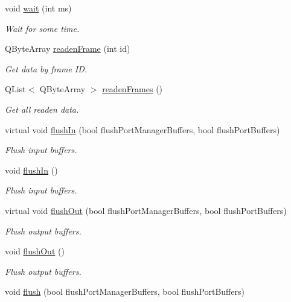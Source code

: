 \begin{DoxyCompactItemize}
void \hyperlink{classmdt_port_manager_aaa85e0200aba0e0f4392dfe01abae2cf}{wait} (int ms)
\begin{DoxyCompactList}\small\item\em Wait for some time. \end{DoxyCompactList}\item 
Q\-Byte\-Array \hyperlink{classmdt_port_manager_a830ae182d06dd6a52c43a7f45b9240ac}{readen\-Frame} (int id)
\begin{DoxyCompactList}\small\item\em Get data by frame I\-D. \end{DoxyCompactList}\item 
Q\-List$<$ Q\-Byte\-Array $>$ \hyperlink{classmdt_port_manager_addd5dcae9644cea42a9871205af41796}{readen\-Frames} ()
\begin{DoxyCompactList}\small\item\em Get all readen data. \end{DoxyCompactList}\item 
virtual void \hyperlink{classmdt_port_manager_ac0844a5cd4043a95a479d458ac7ce590}{flush\-In} (bool flush\-Port\-Manager\-Buffers, bool flush\-Port\-Buffers)
\begin{DoxyCompactList}\small\item\em Flush input buffers. \end{DoxyCompactList}\item 
void \hyperlink{classmdt_port_manager_a4c44ce6ec40c4afc6be441c10d7ee827}{flush\-In} ()
\begin{DoxyCompactList}\small\item\em Flush input buffers. \end{DoxyCompactList}\item 
virtual void \hyperlink{classmdt_port_manager_a3f0c2722a41c49de2bea9013bccd049c}{flush\-Out} (bool flush\-Port\-Manager\-Buffers, bool flush\-Port\-Buffers)
\begin{DoxyCompactList}\small\item\em Flush output buffers. \end{DoxyCompactList}\item 
void \hyperlink{classmdt_port_manager_ab34018a9653a5af784fa7da06a9e50d3}{flush\-Out} ()
\begin{DoxyCompactList}\small\item\em Flush output buffers. \end{DoxyCompactList}\item 
void \hyperlink{classmdt_port_manager_a97b91e7c1641836eb6afb47fd244a18e}{flush} (bool flush\-Port\-Manager\-Buffers, bool flush\-Port\-Buffers)

\end{DoxyCompactItemize}
